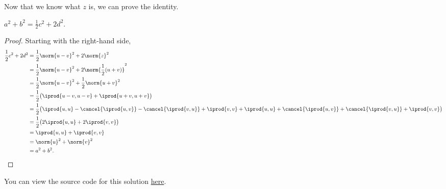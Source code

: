 \documentclass{amsart}
\newcommand{\pagenum}{179}
\newcommand{\probnum}{31}
\begin{document}
Now that we know what $z$ is, we can prove the identity.
\begin{claim*}
    $a^2+b^2=\frac12c^2+2d^2.$
\end{claim*}
\begin{proof}
Starting with the right-hand side,
\begin{align*}
    \frac12c^2+2d^2
    &= \frac12\norm{u-v}^2 + 2\norm{z}^2 \\
    &= \frac12\norm{u-v}^2 + 2\norm{\frac12(u+v)}^2 \\
    &= \frac12\norm{u-v}^2 + \frac12\norm{u+v}^2 \\
    &= \frac12\big(
        \iprod{u-v,u-v} + \iprod{u+v,u+v}
       \big) \\
    &= \frac12\big(
        \iprod{u,u} - \cancel{\iprod{u,v}} - \cancel{\iprod{v,u}} 
        + \iprod{v,v} +\iprod{u,u} +\cancel{\iprod{u,v}} +
        \cancel{\iprod{v,u}} + \iprod{v,v}
       \big) \\
    &= \frac12\big( 2\iprod{u,u}+2\iprod{v,v} \big) \\
    &= \iprod{u,u} + \iprod{v,v} \\
    &= \norm{u}^2 + \norm{v}^2 \\
    &= a^2 + b^2.\qedhere
\end{align*}
\end{proof}

\vspace{0.5in}

\begin{note*}
You can view the source code for this solution
\href{https://github.com/thomasbreydo/linalg/blob/main/\pagenum_\probnum_Thomas_Breydo.tex}
{here}.
\end{note*}
\end{document}
